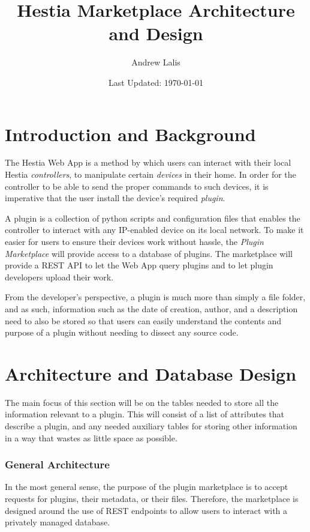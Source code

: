 \documentclass[a4paper, 12pt]{article}
\begin{document}
\title{Hestia Marketplace Architecture and Design}
\author{Andrew Lalis}
\date{Last Updated: \today}
\maketitle

\tableofcontents
\newpage

\part{Introduction and Background}
	The Hestia Web App is a method by which users can interact with their local Hestia \emph{controllers}, to manipulate certain \emph{devices} in their home. In order for the controller to be able to send the proper commands to such devices, it is imperative that the user install the device's required \emph{plugin}.

	A plugin is a collection of python scripts and configuration files that enables the controller to interact with any IP-enabled device on its local network. To make it easier for users to ensure their devices work without hassle, the \emph{Plugin Marketplace} will provide access to a database of plugins. The marketplace will provide a REST API to let the Web App query plugins and to let plugin developers upload their work.

	From the developer's perspective, a plugin is much more than simply a file folder, and as such, information such as the date of creation, author, and a description need to also be stored so that users can easily understand the contents and purpose of a plugin without needing to dissect any source code.

\part{Architecture and Database Design}
	The main focus of this section will be on the tables needed to store all the information relevant to a plugin. This will consist of a list of attributes that describe a plugin, and any needed auxiliary tables for storing other information in a way that wastes as little space as possible.

	\section{General Architecture}
		In the most general sense, the purpose of the plugin marketplace is to accept requests for plugins, their metadata, or their files. Therefore, the marketplace is designed around the use of REST endpoints to allow users to interact with a privately managed database.
\end{document}
